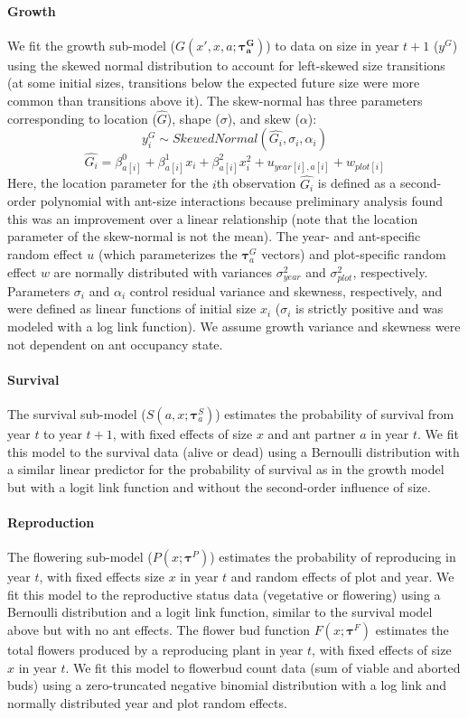 \documentclass[11pt]{article}
\begin{document}
\paragraph{Growth}
We fit the growth sub-model ($G(x',x,a;\pmb{\tau^G_{a}})$) to data on size in year $t+1$ ($y^G$) using the skewed normal distribution to account for left-skewed size transitions (at some initial sizes, transitions below the expected future size were more common than transitions above it). 
The skew-normal has three parameters corresponding to location ($\hat{G}$), shape ($\sigma$), and skew ($\alpha$):
$$y_i^G \sim Skewed Normal(\hat{G_i},\sigma_i,\alpha_i) $$
$$\hat{G_i} = \beta^0_{a[i]} + \beta^1_{a[i]} x_i + \beta^2_{a[i]} x_i^2 + u_{year[i],a[i]} + w_{plot[i]} $$
Here, the location parameter for the $i$th observation $\hat{G_i}$ is defined as a second-order polynomial with ant-size interactions because  preliminary analysis found this was an improvement over a linear relationship (note that the location parameter of the skew-normal is not the mean). 
The year- and ant-specific random effect $u$ (which parameterizes the $\pmb{\tau}^G_{a}$ vectors) and plot-specific random effect $w$ are normally distributed with variances $\sigma^2_{year}$ and $\sigma^2_{plot}$, respectively. 
Parameters $\sigma_i$ and $\alpha_i$  control residual variance and skewness, respectively, and were defined as linear functions of initial size $x_i$ ($\sigma_i$ is strictly positive and was modeled with a log link function). 
We assume growth variance and skewness were not dependent on ant occupancy state. 

\paragraph{Survival}
The survival sub-model ($S(a,x;\pmb{\tau}_{a}^{S})$) estimates the probability of survival from year $t$ to year $t+1$, with fixed effects of size $x$ and ant partner $a$ in year $t$.
We fit this model to the survival data (alive or dead) using a Bernoulli distribution with a similar linear predictor for the probability of survival as in the growth model but with a logit link function and without the second-order influence of size.

\paragraph{Reproduction}
The flowering sub-model ($P(x;\pmb{\tau}^{P})$) estimates the probability of reproducing in year $t$, with fixed effects size $x$ in year $t$ and random effects of plot and year.
We fit this model to the reproductive status data (vegetative or flowering) using a Bernoulli distribution and a logit link function, similar to the survival model above but with no ant effects.  
The flower bud function $F(x;\pmb{\tau}^{F})$ estimates the total flowers produced by a reproducing plant in year $t$, with fixed effects of size $x$ in year $t$. 
We fit this model to flowerbud count data (sum of viable and aborted buds) using a zero-truncated negative binomial distribution with a log link and normally distributed year and plot random effects.
\end{document}
